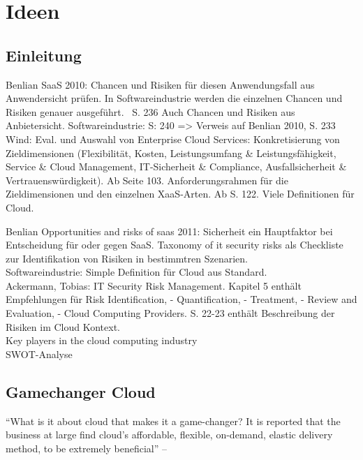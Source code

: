 \section{Ideen}
\subsection{Einleitung}
Benlian SaaS 2010: Chancen und Risiken für diesen Anwendungsfall aus Anwendersicht prüfen. In Softwareindustrie werden die einzelnen Chancen und Risiken genauer ausgeführt. ~S. 236
Auch Chancen und Risiken aus Anbietersicht. Softwareindustrie: S: 240 => Verweis auf Benlian 2010, S. 233 \\
Wind: Eval. und Auswahl von Enterprise Cloud Services: Konkretisierung von Zieldimensionen (Flexibilität, Kosten, Leistungsumfang  \& Leistungsfähigkeit, Service \& Cloud Management, IT-Sicherheit \&
Compliance, Ausfallsicherheit \& Vertrauenswürdigkeit). Ab Seite 103. Anforderungsrahmen für die Zieldimensionen und den einzelnen XaaS-Arten. Ab S. 122. Viele Definitionen für Cloud.

Benlian Opportunities and risks of saas 2011: Sicherheit ein Hauptfaktor bei Entscheidung für oder gegen SaaS. Taxonomy of it security risks als Checkliste zur Identifikation von Risiken in bestimmtren
Szenarien. \\

Softwareindustrie: Simple Definition für Cloud aus Standard. \\

Ackermann, Tobias: IT Security Risk Management. Kapitel 5 enthält Empfehlungen für Risk Identification, - Quantification, - Treatment, - Review and Evaluation, - Cloud Computing Providers. S. 22-23 enthält
Beschreibung der Risiken im Cloud Kontext. \\

Key players in the cloud computing industry 
\\

SWOT-Analyse \\


\subsection{Gamechanger Cloud}
"`What is it about cloud that makes it a game-changer? It
is reported that the business at large find cloud’s affordable,
flexible, on-demand, elastic delivery method, to be extremely
beneficial"'
-- 


